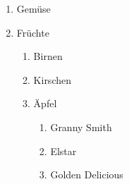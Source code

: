 \documentclass[varwidth]{standalone}
\begin{document}
\begin{enumerate}
	\item Gemüse
	\item Früchte
	\begin{enumerate}
		\item Birnen
		\item Kirschen
		\item Äpfel
		\begin{enumerate}
			\item Granny Smith
			\item Elstar
			\item Golden Delicious
		\end{enumerate}
	\end{enumerate}
\end{enumerate}
\end{document}
